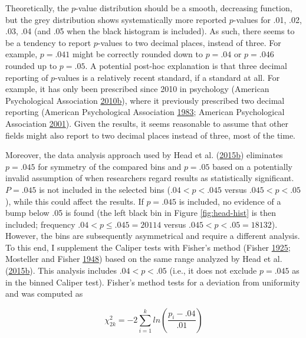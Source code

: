 \documentclass[a5paper]{book}
\begin{document}
Theoretically, the \(p\)-value distribution should be a smooth,
decreasing function, but the grey distribution shows systematically more
reported \(p\)-values for .01, .02, .03, .04 (and .05 when the black
histogram is included). As such, there seems to be a tendency to report
\(p\)-values to two decimal places, instead of three. For example,
\(p=.041\) might be correctly rounded down to \(p=.04\) or \(p=.046\)
rounded up to \(p=.05\). A potential post-hoc explanation is that three
decimal reporting of \(p\)-values is a relatively recent standard, if a
standard at all. For example, it has only been prescribed since 2010 in
psychology (American Psychological Association
\protect\hyperlink{ref-isbn:9781433805615}{2010}\protect\hyperlink{ref-isbn:9781433805615}{b}),
where it previously prescribed two decimal reporting (American
Psychological Association
\protect\hyperlink{ref-American_Psychological_Association1983-yf}{1983};
American Psychological Association
\protect\hyperlink{ref-American_Psychological_Association2001-uw}{2001}).
Given the results, it seems reasonable to assume that other fields might
also report to two decimal places instead of three, most of the time.

Moreover, the data analysis approach used by Head et al.
(\protect\hyperlink{ref-doi:10.1371ux2fjournal.pbio.1002106}{2015}\protect\hyperlink{ref-doi:10.1371ux2fjournal.pbio.1002106}{b})
eliminates \(p=.045\) for symmetry of the compared bins and \(p=.05\)
based on a potentially invalid assumption of when researchers regard
results as statistically significant. \(P=.045\) is not included in the
selected bins (\(.04<p<.045\) versus \(.045<p<.05\)), while this could
affect the results. If \(p=.045\) is included, no evidence of a bump
below .05 is found (the left black bin in Figure \ref{fig:head-hist} is
then included; frequency \(.04<p\leq.045=20114\) versus
\(.045<p<.05=18132\)). However, the bins are subsequently asymmetrical
and require a different analysis. To this end, I supplement the Caliper
tests with Fisher's method (Fisher
\protect\hyperlink{ref-Fisher1925-jl}{1925}; Mosteller and Fisher
\protect\hyperlink{ref-doi:10.2307ux2f2681650}{1948}) based on the same
range analyzed by Head et al.
(\protect\hyperlink{ref-doi:10.1371ux2fjournal.pbio.1002106}{2015}\protect\hyperlink{ref-doi:10.1371ux2fjournal.pbio.1002106}{b}).
This analysis includes \(.04<p<.05\) (i.e., it does not exclude
\(p=.045\) as in the binned Caliper test). Fisher's method tests for a
deviation from uniformity and was computed as

\begin{equation} 
  \chi^2_{2k}=-2\sum^k_{i=1}ln(\frac{p_i-.04}{.01})
  \label{eq:fishmeth}
\end{equation}
\end{document}
